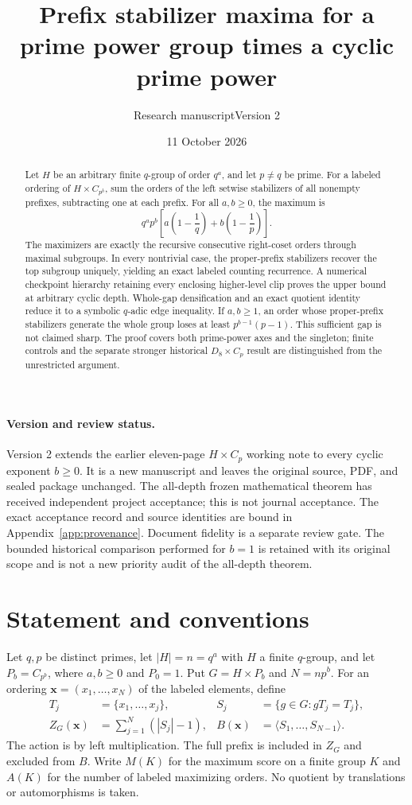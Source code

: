\documentclass[11pt,letterpaper]{article}
\title{\bfseries Prefix stabilizer maxima for a prime power group times a cyclic prime power}
\author{Research manuscript\quad Version 2}
\date{11 October 2026}
\theoremstyle{definition}\newtheorem{definition}{Definition}
\begin{document}
\maketitle\thispagestyle{plain}
\begin{abstract}
Let $H$ be an arbitrary finite $q$-group of order $q^a$, and let $p\ne q$ be prime. For a labeled ordering of $H\times C_{p^b}$, sum the orders of the left setwise stabilizers of all nonempty prefixes, subtracting one at each prefix. For all $a,b\ge0$, the maximum is
\[
q^ap^b\left[a\left(1-\frac1q\right)+b\left(1-\frac1p\right)\right].
\]
The maximizers are exactly the recursive consecutive right-coset orders through maximal subgroups. In every nontrivial case, the proper-prefix stabilizers recover the top subgroup uniquely, yielding an exact labeled counting recurrence. A numerical checkpoint hierarchy retaining every enclosing higher-level clip proves the upper bound at arbitrary cyclic depth. Whole-gap densification and an exact quotient identity reduce it to a symbolic $q$-adic edge inequality. If $a,b\ge1$, an order whose proper-prefix stabilizers generate the whole group loses at least $p^{b-1}(p-1)$. This sufficient gap is not claimed sharp. The proof covers both prime-power axes and the singleton; finite controls and the separate stronger historical $D_8\times C_p$ result are distinguished from the unrestricted argument.
\end{abstract}

\paragraph{Version and review status.}
Version 2 extends the earlier eleven-page $H\times C_p$ working note to every cyclic exponent $b\ge0$. It is a new manuscript and leaves the original source, PDF, and sealed package unchanged. The all-depth frozen mathematical theorem has received independent project acceptance; this is not journal acceptance. The exact acceptance record and source identities are bound in Appendix~\ref{app:provenance}. Document fidelity is a separate review gate. The bounded historical comparison performed for $b=1$ is retained with its original scope and is not a new priority audit of the all-depth theorem.

\section{Statement and conventions}
Let $q,p$ be distinct primes, let $|H|=n=q^a$ with $H$ a finite $q$-group, and let $P_b=C_{p^b}$, where $a,b\ge0$ and $P_0=1$. Put $G=H\times P_b$ and $N=np^b$. For an ordering $\mathbf{x}=(x_1,\ldots,x_N)$ of the labeled elements, define
\begin{align}
T_j&=\{x_1,\ldots,x_j\},& S_j&=\{g\in G:gT_j=T_j\},\label{eq:prefix}\\
Z_G(\mathbf{x})&=\sum_{j=1}^{N}(|S_j|-1),& B(\mathbf{x})&=\langle S_1,\ldots,S_{N-1}\rangle.\label{eq:score}
\end{align}
The action is by left multiplication. The full prefix is included in $Z_G$ and excluded from $B$. Write $M(K)$ for the maximum score on a finite group $K$ and $A(K)$ for the number of labeled maximizing orders. No quotient by translations or automorphisms is taken.
\end{document}

